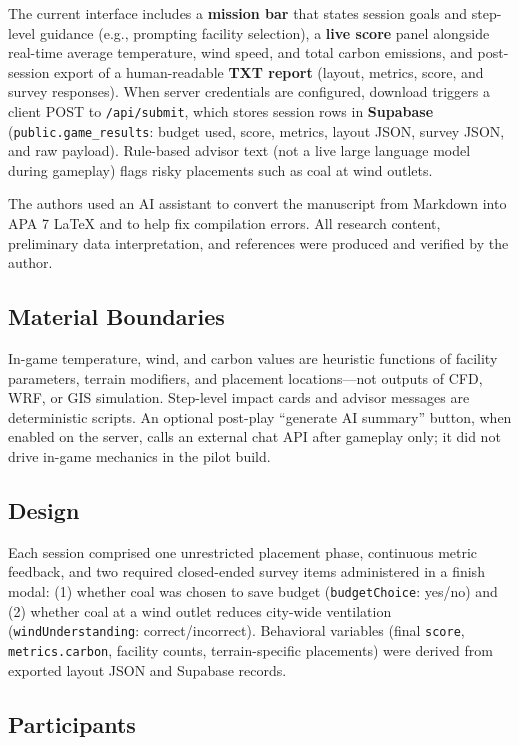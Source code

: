 \documentclass[stu, 12pt, apacite]{apa7}
\begin{document}
The current interface includes a \textbf{mission bar} that states session goals and step-level guidance (e.g., prompting facility selection), a \textbf{live score} panel alongside real-time average temperature, wind speed, and total carbon emissions, and post-session export of a human-readable \textbf{TXT report} (layout, metrics, score, and survey responses). When server credentials are configured, download triggers a client POST to \texttt{/api/submit}, which stores session rows in \textbf{Supabase} (\texttt{public.game\_results}: budget used, score, metrics, layout JSON, survey JSON, and raw payload). Rule-based advisor text (not a live large language model during gameplay) flags risky placements such as coal at wind outlets.

The authors used an AI assistant to convert the manuscript from Markdown into APA 7 \LaTeX{} and to help fix compilation errors. All research content, preliminary data interpretation, and references were produced and verified by the author.

\subsection{Material Boundaries}

In-game temperature, wind, and carbon values are heuristic functions of facility parameters, terrain modifiers, and placement locations---not outputs of CFD, WRF, or GIS simulation. Step-level impact cards and advisor messages are deterministic scripts. An optional post-play ``generate AI summary'' button, when enabled on the server, calls an external chat API after gameplay only; it did not drive in-game mechanics in the pilot build.

\subsection{Design}

Each session comprised one unrestricted placement phase, continuous metric feedback, and two required closed-ended survey items administered in a finish modal: (1) whether coal was chosen to save budget (\texttt{budgetChoice}: yes/no) and (2) whether coal at a wind outlet reduces city-wide ventilation (\texttt{windUnderstanding}: correct/incorrect). Behavioral variables (final \texttt{score}, \texttt{metrics.carbon}, facility counts, terrain-specific placements) were derived from exported layout JSON and Supabase records.

\subsection{Participants}
\end{document}

